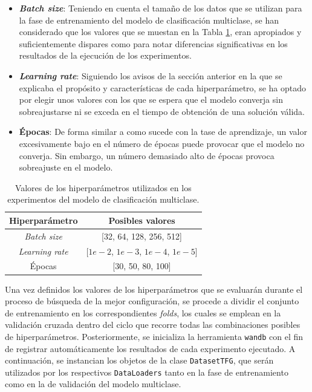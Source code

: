 \begin{itemize}
	\item \textbf{\textit{Batch size}}: Teniendo en cuenta el tamaño de los datos que se utilizan para la fase de entrenamiento del modelo de clasificación multiclase, se han considerado que los valores que se muestan en la Tabla \ref{tab:hiperMUL}, eran apropiados y suficientemente dispares como para notar diferencias significativas en los resultados de la ejecución de los experimentos.
	\item \textbf{\textit{Learning rate}}: Siguiendo los avisos de la sección anterior en la que se explicaba el propósito y características de cada hiperparámetro, se ha optado por elegir unos valores con los que se espera que el modelo converja sin sobreajustarse ni se exceda en el tiempo de obtención de una solución válida.
	\item \textbf{Épocas}: De forma similar a como sucede con la tase de aprendizaje, un valor excesivamente bajo en el número de épocas puede provocar que el modelo no converja. Sin embargo, un número demasiado alto de épocas provoca sobreajuste en el modelo.
\end{itemize}

\begin{table}[H]
\centering
\begin{tabular}{|c|c|}
\hline
\textbf{Hiperparámetro} & \textbf{Posibles valores} \\ \hline
\textit{Batch size} & [32, 64, 128, 256, 512] \\ \hline
\textit{Learning rate} & [$1e-2$, $1e-3$, $1e-4$, $1e-5$] \\ \hline
Épocas & [30, 50, 80, 100] \\ \hline
\end{tabular}
\caption{Valores de los hiperparámetros utilizados en los experimentos del modelo de clasificación multiclase.}
\label{tab:hiperMUL}
\end{table}


Una vez definidos los valores de los hiperparámetros que se evaluarán durante el proceso de búsqueda de la mejor configuración, se procede a dividir el conjunto de entrenamiento en los correspondientes \textit{folds}, los cuales se emplean en la validación cruzada dentro del ciclo que recorre todas las combinaciones posibles de hiperparámetros. Posteriormente, se inicializa la herramienta \texttt{wandb} con el fin de registrar automáticamente los resultados de cada experimento ejecutado. A continuación, se instancian los objetos de la clase \texttt{DatasetTFG}, que serán utilizados por los respectivos \texttt{DataLoaders} tanto en la fase de entrenamiento como en la de validación del modelo multiclase. 

